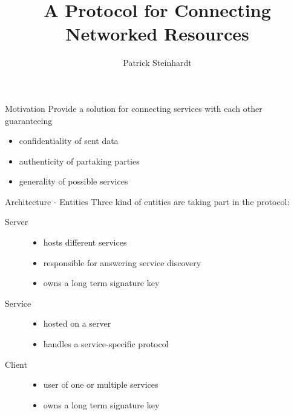 \documentclass[a4paper]{beamer}
\author{Patrick Steinhardt}
\title{A Protocol for Connecting Networked Resources}
\institute{Freie Universität Berlin}
\begin{document}
\begin{frame}[plain]
    \maketitle
\end{frame}

\begin{frame}{Motivation}
    Provide a solution for connecting services with each other  guaranteeing
    \begin{itemize}
        \item confidentiality of sent data
        \item authenticity of partaking parties
        \item generality of possible services
    \end{itemize}
\end{frame}

\begin{frame}{Architecture - Entities}
    Three kind of entities are taking part in the protocol:

    \begin{description}
        \item[Server]
            \begin{itemize}
                \item hosts different services
                \item responsible for answering service discovery
                \item owns a long term signature key
            \end{itemize}
        \item[Service]
            \begin{itemize}
                \item hosted on a server
                \item handles a service-specific protocol
            \end{itemize}
        \item[Client]
            \begin{itemize}
                \item user of one or multiple services
                \item owns a long term signature key
            \end{itemize}
    \end{description}
\end{frame}
\end{document}
